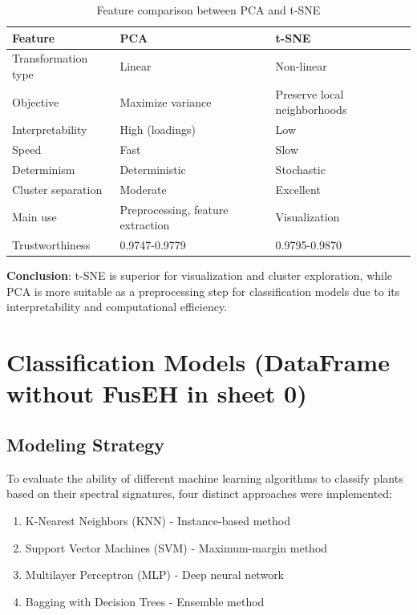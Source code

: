 \documentclass[12pt,a4paper]{article}
\begin{document}
\begin{table}[H]
\centering
\caption{Feature comparison between PCA and t-SNE}
\label{tab:pca_vs_tsne}
\begin{tabular}{p{4cm}p{5cm}p{5cm}}
\toprule
\textbf{Feature} & \textbf{PCA} & \textbf{t-SNE} \\
\midrule
Transformation type & Linear & Non-linear \\
Objective & Maximize variance & Preserve local neighborhoods \\
Interpretability & High (loadings) & Low \\
Speed & Fast & Slow \\
Determinism & Deterministic & Stochastic \\
Cluster separation & Moderate & Excellent \\
Main use & Preprocessing, feature extraction & Visualization \\
Trustworthiness & 0.9747-0.9779 & 0.9795-0.9870 \\
\bottomrule
\end{tabular}
\end{table}

\textbf{Conclusion}: t-SNE is superior for visualization and cluster exploration, while PCA is more suitable as a preprocessing step for classification models due to its interpretability and computational efficiency.

\newpage
\section{Classification Models (DataFrame without FusEH in sheet 0)}
\label{sec:models}

\subsection{Modeling Strategy}

To evaluate the ability of different machine learning algorithms to classify plants based on their spectral signatures, four distinct approaches were implemented:

\begin{enumerate}
    \item K-Nearest Neighbors (KNN) - Instance-based method
    \item Support Vector Machines (SVM) - Maximum-margin method
    \item Multilayer Perceptron (MLP) - Deep neural network
    \item Bagging with Decision Trees - Ensemble method
\end{enumerate}
\end{document}
